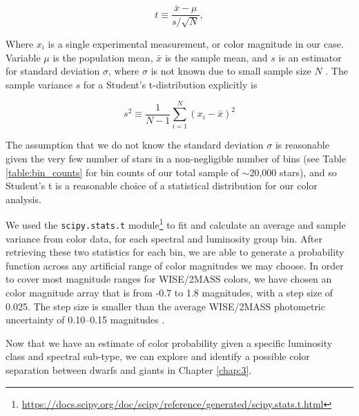 \begin{equation}
    t \equiv \frac{\bar{x}-\mu}{s/\sqrt{N}} ,
\end{equation}

Where $x_{i}$ is a single experimental measurement, or color magnitude in our case. Variable $\mu$ is the population mean, $\bar{x}$ is the sample mean, and $s$ is an estimator for standard deviation $\sigma$, where $\sigma$ is not known due to small sample size $N$ \citep[student-t-citation][]{student-t}. The sample variance $s$ for a Student's t-distribution explicitly is

\begin{equation}
    s^2 \equiv \frac{1}{N-1}\sum_{i=1}^{N} (x_{i}-\bar{x})^2
\end{equation}

The assumption that we do not know the standard deviation $\sigma$ is reasonable given the very few number of stars in a non-negligible number of bins (see Table \ref{table:bin_counts} for bin counts of our total sample of $\sim$20,000 stars), and so Student's t is a reasonable choice of a statistical distribution for our color analysis.

We used the \texttt{scipy.stats.t} module\footnote{\url{https://docs.scipy.org/doc/scipy/reference/generated/scipy.stats.t.html}} to fit and calculate an average and sample variance from color data, for each spectral and luminosity group bin. After retrieving these two statistics for each bin, we are able to generate a probability function across any artificial range of color magnitudes we may choose. In order to cover most magnitude ranges for WISE/2MASS colors, we have chosen an color magnitude array that is from -0.7 to 1.8 magnitudes, with a step size of 0.025. The step size is smaller than the average WISE/2MASS photometric uncertainty of 0.10--0.15 magnitudes \citep{2MASS,ALLWISE}. 

Now that we have an estimate of color probability given a specific luminosity class and spectral sub-type, we can explore and identify a possible color separation between dwarfs and giants in Chapter \ref{chap:3}. 



